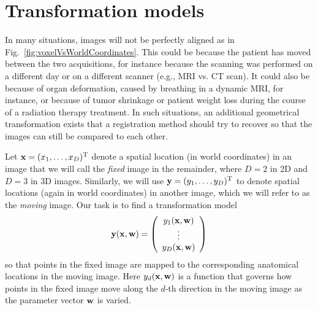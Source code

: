 \documentclass[10pt,twoside]{book}
\begin{document}
\section{Transformation models}

% 
% 
% 
% 

In many situations, images will not be perfectly aligned as in Fig.~\ref{fig:voxelVsWorldCoordinates}. This could be because the patient has moved between the two acquisitions, for instance because the scanning was performed on a different day or on a different scanner (e.g., MRI vs. CT scan). It could also be because of organ deformation, caused by breathing in a dynamic MRI, for instance, or because of tumor shrinkage or patient weight loss during the course of a radiation therapy treatment. In such situations, an additional geometrical transformation exists that a registration method should try to recover so that the images can still be compared to each other.

Let $\mathbf{x}=(x_1, \ldots, x_D)^\mathrm{T}$ denote a spatial location (in world coordinates) in an image that we will call the \emph{fixed} image in the remainder,
where $D=2$ in 2D and $D=3$ in 3D images.
Similarly, we will use $\mathbf{y}=(y_1, \ldots, y_D)^\mathrm{T}$ to denote 
spatial locations (again in world coordinates) in another image, which we will refer to as the \emph{moving} image. Our task is to find a transformation model
\begin{equation}
\mathbf{y}( \mathbf{x}, \mathbf{w} ) 
=
\left(
\begin{array}{c}
y_1( \mathbf{x}, \mathbf{w} ) \\
\vdots \\
y_D( \mathbf{x}, \mathbf{w} ) \\
\end{array}
\right)
\label{eq:mapping}
\end{equation}
so that points 
in the fixed image are mapped to the corresponding anatomical locations 
in the moving image.
% 
Here $y_d( \mathbf{x}, \mathbf{w})$ is a function that governs how points 
in the fixed image
move along the $d$-th direction
in the moving image as the 
parameter vector $\mathbf{w}$
is varied.
\end{document}
